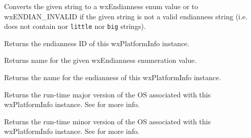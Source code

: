 \label{wxplatforminfogetendianness}


Converts the given string to a wxEndianness enum value or to
wxENDIAN\_INVALID if the given string is not a valid endianness string
(i.e. does not contain nor {\tt little} nor {\tt big} strings).


Returns the endianness ID of this wxPlatformInfo instance.

\label{wxplatforminfogetendiannessname}


Returns name for the given wxEndianness enumeration value.


Returns the name for the endianness of this wxPlatformInfo instance.





\label{wxplatforminfogetosmajorversion}


Returns the run-time major version of the OS associated with this wxPlatformInfo instance.
See  for more info.




\label{wxplatforminfogetosminorversion}


Returns the run-time minor version of the OS associated with this wxPlatformInfo instance.
See  for more info.





\label{wxplatforminfogetoperatingsystemfamilyname}

